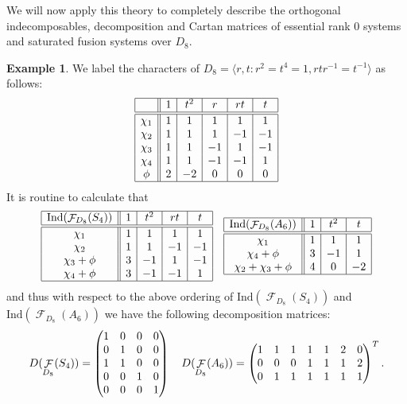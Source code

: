 \documentclass[12pt]{article}
\DeclareMathOperator{\sF}{\mathcal{F}}
\theoremstyle{plain}
\theoremstyle{definition}
\newtheorem{example}[thm]{Example}
\begin{document}
We will now apply this theory to completely describe the orthogonal indecomposables, decomposition and Cartan matrices of essential rank $0$ systems and saturated fusion systems over $D_8$.
\begin{example}
We label the characters of $D_8 = \langle r, t \colon r^2 = t^4 = 1, rtr^{-1} = t^{-1} \rangle$ as follows: \small
\[\begin{array}{|c||c|c|c|c|c|} \hline
& 1 & t^2 & r & rt & t \\ \hline \hline
\chi_1 & 1 & 1 & 1 & 1 & 1 \\ 
\chi_2 & 1 & 1 & 1 & -1 & -1 \\
\chi_3 & 1 & 1 & -1 & 1 & -1 \\
\chi_4 & 1 & 1 & -1 & -1 & 1 \\
\phi & 2 & -2 & 0 & 0 & 0 \\ \hline
\end{array}\]
\normalsize It is routine to calculate that \small
\[\begin{array}{|c||c|c|c|c|c|}\hline
\text{Ind}(\sF_{D_8}(S_4)) & 1 & t^2 & rt & t \\ \hline \hline
\chi_1 & 1 & 1 & 1 & 1 \\ 
\chi_2 & 1 & 1 & -1 & -1 \\
\chi_3+\phi & 3 & -1 & 1 & -1 \\
\chi_4+\phi & 3 & -1 & -1 & 1 \\\hline
\end{array}\quad
\begin{array}{|c||c|c|c|}\hline
\text{Ind}(\sF_{D_8}(A_6)) & 1 & t^2 & t \\ \hline\hline
\chi_1 & 1 & 1 & 1 \\ 
\chi_4+\phi & 3 & -1 & 1 \\ 
\chi_2+\chi_3+\phi & 4 & 0 & -2 \\ \hline
\end{array}\]
\normalsize and thus with respect to the above ordering of $\text{Ind}(\sF_{D_8}(S_4))$ and $\text{Ind}(\sF_{D_8}(A_6))$ we have the following decomposition matrices:
\[D(\sF_{D_8}(S_4)) = \small\begin{pmatrix} 1 & 0 & 0 & 0 \\ 0 & 1 & 0 & 0 \\ 1 & 1 & 0 & 0 \\ 0 & 0 & 1 & 0 \\ 0 & 0 & 0 & 1 \end{pmatrix} \quad \normalsize D(\sF_{D_8}(A_6)) = 
\small\begin{pmatrix} 1 & 1 & 1 & 1 & 1 & 2 & 0 \\ 0 & 0 & 0 & 1 & 1 & 1 & 2 \\ 0 & 1 & 1 & 1 & 1 & 1 & 1 \end{pmatrix}^T . 
\]
\end{example}
\end{document}
